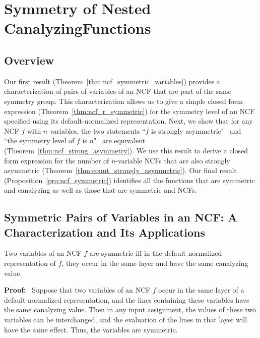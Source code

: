 \section{Symmetry of Nested Canalyzing\newline Functions}
\label{sec:ncf_and_symmetry}

\subsection{Overview}
\label{sse:res_overview}
Our first result (Theorem~\ref{thm:ncf_symmetric_variables})
provides a characterization of pairs of variables of an NCF
that are part of the same symmetry group. 
This characterization allows us to give a simple closed form
expression (Theorem~\ref{thm:ncf_r_symmetric}) 
for the symmetry level of an NCF specified using
its default-normalized representation.
Next, we show that for any NCF $f$ with $n$ variables,
the two statements ``$f$ is strongly asymmetric" ~and~
``the symmetry level of $f$ is $n$"~ are equivalent 
(Theorem~\ref{thm:ncf_strong_asymmetry}).
We use this result to derive a closed form expression 
for the number of $n$-variable NCFs that are 
also strongly asymmetric (Theorem~\ref{thm:count_strongly_asymmetric}).
Our final result (Proposition~\ref{pro:ncf_symmetric})
identifies all the functions that are symmetric and
canalyzing as well as those that are symmetric and NCFs.

\subsection{Symmetric Pairs of Variables in an NCF: A Characterization
and Its Applications}
\label{sse:ncf_strong_sym}

\begin{theorem}\label{thm:ncf_symmetric_variables}
Two variables of an NCF $f$ are symmetric iff
in the default-normalized representation of $f$,
they occur in the same layer and have the same canalyzing value.
\end{theorem}
\noindent
\textbf{Proof:}~
Suppose that two variables of an NCF $f$ occur in the same layer of a
default-normalized representation, and the lines containing these variables
have the same canalyzing value.  Then in any input assignment, the
values of these two variables can be interchanged, and the evaluation
of the lines in that layer will have the same effect.  Thus, the
variables are symmetric.

